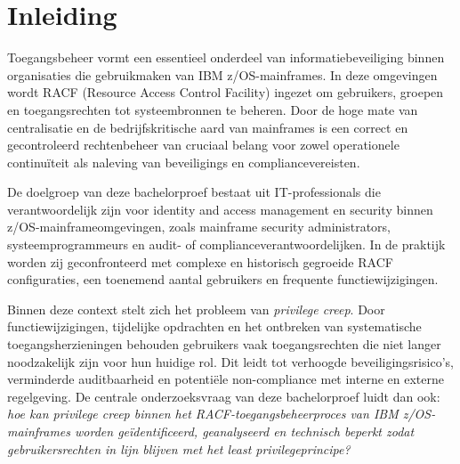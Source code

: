 


% 

\section{Inleiding}%
\label{sec:inleiding}

Toegangsbeheer vormt een essentieel onderdeel van informatiebeveiliging binnen organisaties die gebruikmaken van IBM z/OS-mainframes. In deze omgevingen wordt RACF (Resource Access Control Facility) ingezet om gebruikers, groepen en toegangsrechten tot systeembronnen te beheren. Door de hoge mate van centralisatie en de bedrijfskritische aard van mainframes is een correct en gecontroleerd rechtenbeheer van cruciaal belang voor zowel operationele continuïteit als naleving van beveiligings en compliancevereisten.

De doelgroep van deze bachelorproef bestaat uit IT-professionals die verantwoordelijk zijn voor identity and access management en security binnen z/OS-mainframeomgevingen, zoals mainframe security administrators, systeemprogrammeurs en audit- of complianceverantwoordelijken. In de praktijk worden zij geconfronteerd met complexe en historisch gegroeide RACF configuraties, een toenemend aantal gebruikers en frequente functiewijzigingen.

Binnen deze context stelt zich het probleem van \emph{privilege creep}. Door functiewijzigingen, tijdelijke opdrachten en het ontbreken van systematische toegangsherzieningen behouden gebruikers vaak toegangsrechten die niet langer noodzakelijk zijn voor hun huidige rol. Dit leidt tot verhoogde beveiligingsrisico’s, verminderde auditbaarheid en potentiële non-compliance met interne en externe regelgeving. De centrale onderzoeksvraag van deze bachelorproef luidt dan ook: \emph{hoe kan privilege creep binnen het RACF-toegangsbeheerproces van IBM z/OS-mainframes worden geïdentificeerd, geanalyseerd en technisch beperkt zodat gebruikersrechten in lijn blijven met het least privilegeprincipe?}

